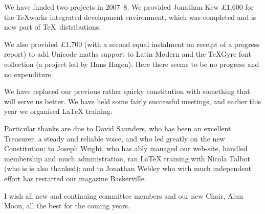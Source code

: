 \documentclass[11pt,a4paper]{article}
\begin{document}
We have funded two projects in 2007--8.  We provided Jonathan
Kew \pounds 1,600 for the TeXworks integrated development
environment, which was completed and is now part of \TeX\
distributions.

We also provided \pounds 1,700 (with a second equal instalment on
receipt of a progress report) to add Unicode maths support to Latin
Modern and the TeXGyre font collection (a project led by Hans Hagen).
Here there seems to be no progress and no expenditure.

We have replaced our previous rather quirky constitution with
something that will serve us better. We have held some fairly
successful meetings, and earlier this year we organised LaTeX
training.

Particular thanks are due to David Saunders, who has been an excellent
Treasurer, a steady and reliable voice, and who led greatly on the new
Constitution; to Joseph Wright, who has ably managed our web-site,
handled membership and much administration, ran \LaTeX{} training with
Nicola Talbot (who is is also thanked); and to Jonathan Webley who
with much independent effort has restarted our magazine Baskerville.

I wish all new and continuing committee members and our new Chair,
Alun Moon, all the best for the coming years.


\smallskip

\end{document}
